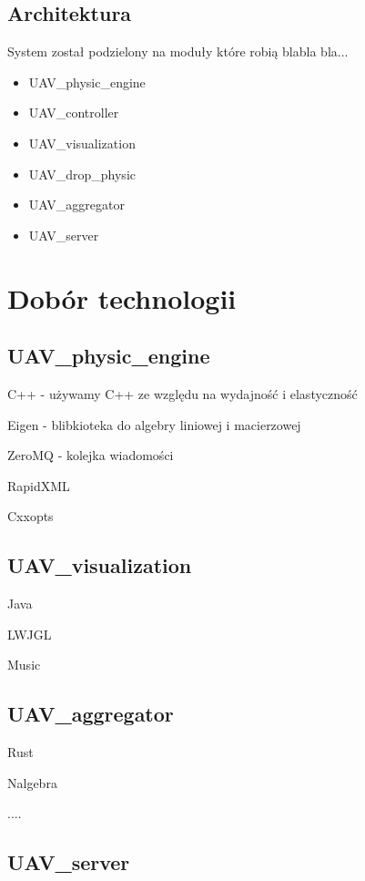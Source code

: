 \documentclass[15pt]{sprawozdanie}
\begin{document}
\color{red}

\subsection{Architektura}

System został podzielony na moduły które robią blabla bla...

\begin{itemize}
\item UAV\_physic\_engine 
\item UAV\_controller 
\item UAV\_visualization 
\item UAV\_drop\_physic 
\item UAV\_aggregator 
\item UAV\_server 

\end{itemize}

\newpage

\section{Dobór technologii}

\subsection{UAV\_physic\_engine}

C++ - używamy C++ ze względu na wydajność i elastyczność

Eigen - blibkioteka do algebry liniowej i macierzowej

ZeroMQ - kolejka wiadomości

RapidXML

Cxxopts

\subsection{UAV\_visualization}

Java

LWJGL

Music

\subsection{UAV\_aggregator}

Rust

Nalgebra

....


\subsection{UAV\_server}
\end{document}
